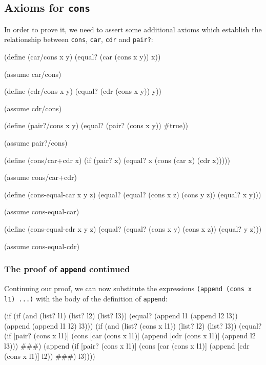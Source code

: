 \subsection{Axioms for \texttt{cons}}

In order to prove it, we need to assert some additional axioms which
establish the relationship between \texttt{cons}, \texttt{car}, \texttt{cdr}
and \texttt{pair?}:

\begin{Snippet}
  (define (car/cons x y)
    (equal? (car (cons x y)) x))

  (assume car/cons)
\end{Snippet}
\begin{Snippet}
  (define (cdr/cons x y)
    (equal? (cdr (cons x y)) y))

  (assume cdr/cons)
\end{Snippet}
\begin{Snippet}
  (define (pair?/cons x y)
    (equal? (pair? (cons x y)) #true))

  (assume pair?/cons)
\end{Snippet}
\begin{Snippet}
  (define (cons/car+cdr x)
    (if (pair? x)
      (equal? x (cons (car x) (cdr x)))))

  (assume cons/car+cdr)
\end{Snippet}
\begin{Snippet}
  (define (cons-equal-car x y z)
    (equal? (equal? (cons x z) (cons y z))
            (equal? x y)))

  (assume cons-equal-car)
\end{Snippet}
\begin{Snippet}
  (define (cons-equal-cdr x y z)
    (equal? (equal? (cons x y) (cons x z))
            (equal? y z)))

  (assume cons-equal-cdr)
\end{Snippet}

\subsubsection{The proof of \texttt{append} continued}

Continuing our proof, we can now substitute the expressions
\texttt{(append (cons x l1) ...)} with the body of the definition
of \texttt{append}:

\begin{Snippet}
  (if (if (and (list? l1) (list? l2) (list? l3))
          (equal? (append l1 (append l2 l3))
                  (append (append l1 l2) l3)))
      (if (and (list? (cons x l1)) (list? l2) (list? l3))
          (equal? (if [pair? (cons x l1)]
                      (cons [car (cons x l1)]
                            (append [cdr (cons x l1)]
                                    (append l2 l3)))
                      ###)
                  (append (if [pair? (cons x l1)]
                              (cons [car (cons x l1)]
                                    (append [cdr (cons x l1)] l2))
                              ###) l3))))
\end{Snippet}

